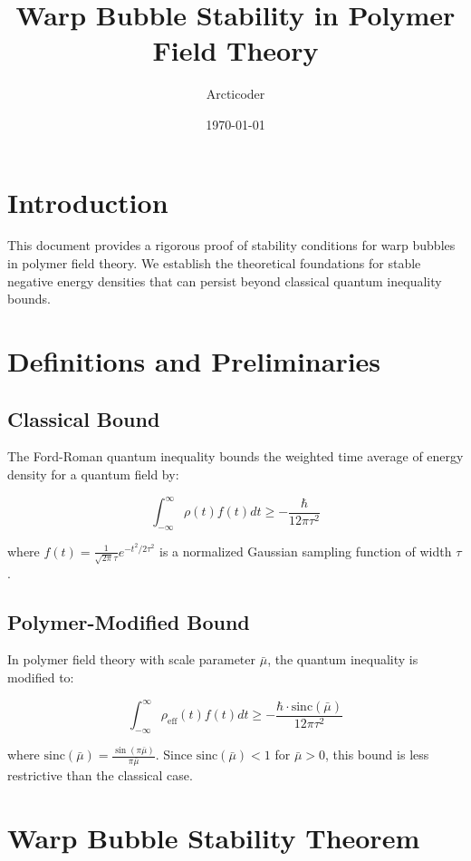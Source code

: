 \documentclass{article}
\title{Warp Bubble Stability in Polymer Field Theory}
\author{Arcticoder}
\date{\today}
\begin{document}
\maketitle

\section{Introduction}

This document provides a rigorous proof of stability conditions for warp bubbles in polymer field theory. We establish the theoretical foundations for stable negative energy densities that can persist beyond classical quantum inequality bounds.

\section{Definitions and Preliminaries}

\subsection{Classical Bound}

The Ford-Roman quantum inequality bounds the weighted time average of energy density for a quantum field by:

\begin{equation}
\int_{-\infty}^{\infty} \rho(t) f(t) dt \geq -\frac{\hbar}{12\pi \tau^2}
\end{equation}

where $f(t) = \frac{1}{\sqrt{2\pi}\tau} e^{-t^2/2\tau^2}$ is a normalized Gaussian sampling function of width $\tau$.

\subsection{Polymer-Modified Bound}

In polymer field theory with scale parameter $\bar{\mu}$, the quantum inequality is modified to:

\begin{equation}
\int_{-\infty}^{\infty} \rho_{\text{eff}}(t) f(t) dt \geq -\frac{\hbar \cdot \text{sinc}(\bar{\mu})}{12\pi \tau^2}
\end{equation}

where $\text{sinc}(\bar{\mu}) = \frac{\sin(\pi\bar{\mu})}{\pi\bar{\mu}}$. Since $\text{sinc}(\bar{\mu}) < 1$ for $\bar{\mu} > 0$, this bound is less restrictive than the classical case.

\section{Warp Bubble Stability Theorem}
\end{document}
